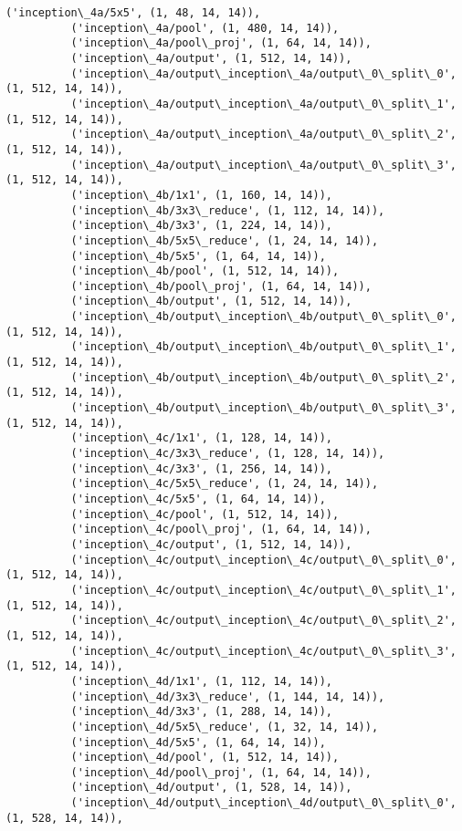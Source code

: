 \documentclass{article}
\begin{document}
\begin{Verbatim}[commandchars=\\\{\}]
          ('inception\_4a/5x5', (1, 48, 14, 14)),
          ('inception\_4a/pool', (1, 480, 14, 14)),
          ('inception\_4a/pool\_proj', (1, 64, 14, 14)),
          ('inception\_4a/output', (1, 512, 14, 14)),
          ('inception\_4a/output\_inception\_4a/output\_0\_split\_0', (1, 512, 14, 14)),
          ('inception\_4a/output\_inception\_4a/output\_0\_split\_1', (1, 512, 14, 14)),
          ('inception\_4a/output\_inception\_4a/output\_0\_split\_2', (1, 512, 14, 14)),
          ('inception\_4a/output\_inception\_4a/output\_0\_split\_3', (1, 512, 14, 14)),
          ('inception\_4b/1x1', (1, 160, 14, 14)),
          ('inception\_4b/3x3\_reduce', (1, 112, 14, 14)),
          ('inception\_4b/3x3', (1, 224, 14, 14)),
          ('inception\_4b/5x5\_reduce', (1, 24, 14, 14)),
          ('inception\_4b/5x5', (1, 64, 14, 14)),
          ('inception\_4b/pool', (1, 512, 14, 14)),
          ('inception\_4b/pool\_proj', (1, 64, 14, 14)),
          ('inception\_4b/output', (1, 512, 14, 14)),
          ('inception\_4b/output\_inception\_4b/output\_0\_split\_0', (1, 512, 14, 14)),
          ('inception\_4b/output\_inception\_4b/output\_0\_split\_1', (1, 512, 14, 14)),
          ('inception\_4b/output\_inception\_4b/output\_0\_split\_2', (1, 512, 14, 14)),
          ('inception\_4b/output\_inception\_4b/output\_0\_split\_3', (1, 512, 14, 14)),
          ('inception\_4c/1x1', (1, 128, 14, 14)),
          ('inception\_4c/3x3\_reduce', (1, 128, 14, 14)),
          ('inception\_4c/3x3', (1, 256, 14, 14)),
          ('inception\_4c/5x5\_reduce', (1, 24, 14, 14)),
          ('inception\_4c/5x5', (1, 64, 14, 14)),
          ('inception\_4c/pool', (1, 512, 14, 14)),
          ('inception\_4c/pool\_proj', (1, 64, 14, 14)),
          ('inception\_4c/output', (1, 512, 14, 14)),
          ('inception\_4c/output\_inception\_4c/output\_0\_split\_0', (1, 512, 14, 14)),
          ('inception\_4c/output\_inception\_4c/output\_0\_split\_1', (1, 512, 14, 14)),
          ('inception\_4c/output\_inception\_4c/output\_0\_split\_2', (1, 512, 14, 14)),
          ('inception\_4c/output\_inception\_4c/output\_0\_split\_3', (1, 512, 14, 14)),
          ('inception\_4d/1x1', (1, 112, 14, 14)),
          ('inception\_4d/3x3\_reduce', (1, 144, 14, 14)),
          ('inception\_4d/3x3', (1, 288, 14, 14)),
          ('inception\_4d/5x5\_reduce', (1, 32, 14, 14)),
          ('inception\_4d/5x5', (1, 64, 14, 14)),
          ('inception\_4d/pool', (1, 512, 14, 14)),
          ('inception\_4d/pool\_proj', (1, 64, 14, 14)),
          ('inception\_4d/output', (1, 528, 14, 14)),
          ('inception\_4d/output\_inception\_4d/output\_0\_split\_0', (1, 528, 14, 14)),

\end{Verbatim}
\end{document}

